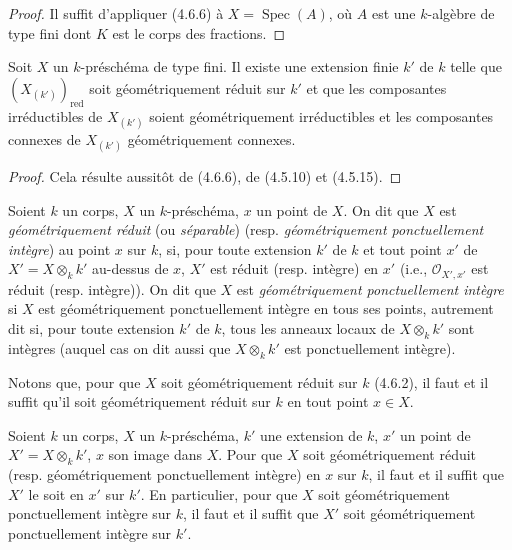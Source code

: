 \begin{proof}
Il suffit d'appliquer (4.6.6) à $X=\operatorname{Spec}(A)$, où $A$ est une
$k$-algèbre de type fini dont $K$ est le corps des fractions.
\end{proof}

\begin{corollary}[4.6.8]
\label{IV.2.4.6.8-fr}
Soit $X$ un $k$-préschéma de type fini. Il existe une extension finie $k'$ de
$k$ telle que $(X_{(k')})_{\mathrm{red}}$ soit géométriquement réduit sur $k'$
et que les composantes irréductibles de $X_{(k')}$ soient géométriquement
irréductibles et les composantes connexes de $X_{(k')}$ géométriquement
connexes.
\end{corollary}

\begin{proof}
Cela résulte aussitôt de (4.6.6), de (4.5.10) et (4.5.15).
\end{proof}

\begin{definition}[4.6.9]
\label{IV.2.4.6.9-fr}
Soient $k$ un corps, $X$ un $k$-préschéma, $x$ un point de $X$. On dit que $X$
est \emph{géométriquement réduit} (ou \emph{séparable}) \textup{(resp.}
\emph{géométriquement ponctuellement intègre}) au point $x$ sur $k$, si, pour
toute extension $k'$ de $k$ et tout point $x'$ de
$X'=X\otimes_k k'$ au-dessus de $x$, $X'$ est réduit \textup{(resp.} intègre) en $x'$
\textup{(i.e.,} $\mathcal O_{X',x'}$ est réduit \textup{(resp.} intègre)). On dit que $X$ est
\emph{géométriquement ponctuellement intègre} si $X$ est géométriquement
ponctuellement intègre en tous ses points, autrement dit si, pour toute
extension $k'$ de $k$, tous les anneaux locaux de $X\otimes_k k'$ sont intègres
\textup{(auquel cas on dit aussi que $X\otimes_k k'$ est} ponctuellement intègre\textup{)}.
\end{definition}

Notons que, pour que $X$ soit géométriquement réduit sur $k$ (4.6.2), il faut
et il suffit qu'il soit géométriquement réduit sur $k$ en tout point $x\in X$.

\begin{proposition}[4.6.10]
\label{IV.2.4.6.10-fr}
Soient $k$ un corps, $X$ un $k$-préschéma, $k'$ une extension de $k$, $x'$ un
point de $X'=X\otimes_k k'$, $x$ son image dans $X$. Pour que $X$ soit
géométriquement réduit \textup{(resp.} géométriquement ponctuellement intègre) en $x$
sur $k$, il faut et il suffit que $X'$ le soit en $x'$ sur $k'$. En particulier,
pour que $X$ soit géométriquement ponctuellement intègre sur $k$, il faut et il
suffit que $X'$ soit géométriquement ponctuellement intègre sur $k'$.
\end{proposition}

